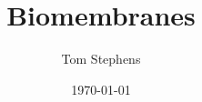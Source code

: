 \documentclass[10pt]{article}
\title{Biomembranes}
\author{Tom Stephens}
\date{ \today}
\begin{document}
\maketitle


\cite{DoganNochetto:2012}







\end{document}
